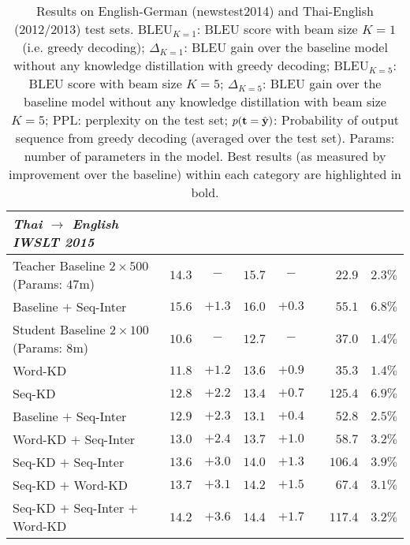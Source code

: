 \documentclass[11pt,letterpaper]{article}
\begin{document}
\begin{table*}[!ht]
\begin{tabular}{l c c  c c r r r }
\bottomrule
\toprule
\textit{Thai $\rightarrow$ English IWSLT 2015} \\ 
\midrule
Teacher Baseline $2 \times 500$ $\,$ (Params: $47$m) & $14.3$ &  $-$ & $15.7$&   $-$ &  & $22.9$ & $2.3\%$ \\
\hspace{4mm}  Baseline $+$ Seq-Inter   & $15.6$ & $+1.3$& $16.0$& $+0.3$& & $55.1$ &  $6.8\%$ \\
\midrule
Student Baseline $2 \times 100$ $\,$ (Params: $8$m) & $10.6$ & $-$ & $12.7$&   $-$ & & $37.0$ & $1.4\%$  \\
\hspace{4mm}  Word-KD   & $11.8$ & $+1.2$& $13.6$&  $+0.9$& & $35.3$ &  $1.4\%$\\
\hspace{4mm}  Seq-KD   & $12.8$ & $+2.2$& $13.4$& $+0.7$& & $125.4$ & $6.9\%$  \\
\hspace{4mm}  Baseline $+$ Seq-Inter   & $12.9$ & $+2.3$& $13.1$& $+0.4$& & $52.8$ & $2.5\%$  \\
\hspace{4mm} Word-KD $+$ Seq-Inter  & $13.0$ & $+2.4$& $13.7$& $+1.0$ & & $58.7$ &  $3.2\%$  \\
\hspace{4mm}  Seq-KD $+$ Seq-Inter   & $13.6$ & $+3.0$& $14.0$&  $+1.3$& & $106.4$ & $3.9\%$  \\
\hspace{4mm}  Seq-KD $+$ Word-KD   & $13.7$ & $+3.1 $& $14.2$&  $+1.5$ && $67.4$& $3.1\%$ \\
\hspace{4mm} Seq-KD $+$ Seq-Inter $+$ Word-KD   & $14.2$ & $+\mathbf{3.6}$& $14.4$& $+\mathbf{1.7}$ & & $117.4$ & $3.2\%$ \\
\bottomrule
\end{tabular}
\caption{Results on English-German (newstest2014) and Thai-English (2012/2013) test sets.
BLEU$_{K=1}$: BLEU score with beam size $K=1$ (i.e. greedy
decoding); $\Delta_{K=1}$: BLEU gain over the baseline model without any knowledge distillation with greedy decoding;  BLEU$_{K=5}$: BLEU score with beam size $K=5$;
 $\Delta_{K=5}$: BLEU gain over the baseline model without any knowledge distillation with beam size $K = 5$; 
PPL: perplexity on the test set; $p(\mathbf{t} = \hat{\mathbf{y}})$: Probability of output sequence from greedy decoding 
(averaged over the test set). Params: number of parameters in the model. Best results (as measured by improvement over the baseline)
within each category are highlighted in bold.}
\end{table*}
\end{document}
